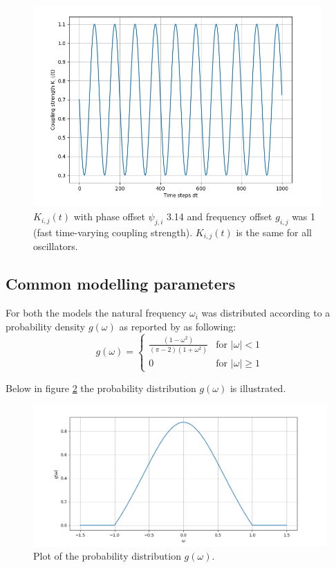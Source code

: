\documentclass{article}
\begin{document}
\begin{figure}[H]
    \centering
    \includegraphics[width = 11cm]{Proj_fig3.png}
    \caption{\( K_{i,j}(t) \) with phase offset \( \psi_{j,i} \) 3.14 and frequency offset \( g_{i,j} \) was 1 (fast time-varying coupling strength). \( K_{i,j}(t) \) is the same for all oscillators.}
    \label{fig:3}
\end{figure}

\subsection{Common modelling parameters}

For both the models the natural frequency \(\omega_i\) was distributed according to a probability density \(g(\omega)\) as reported by \cite{Cumin} as following:
\begin{equation}
g(\omega) = 
\begin{cases} 
\frac{(1 - \omega^2)}{(\pi - 2)(1 + \omega^2)} & \text{for } |\omega| < 1 \\
0 & \text{for } |\omega| \geq 1
\end{cases}
\end{equation}

Below in figure \ref{fig:4} the probability distribution \(g(\omega)\) is illustrated.

\begin{figure}[H]
    \centering
    \includegraphics[width = 12cm]{G_omega.png}
    \caption{Plot of the probability distribution \(g(\omega)\).}
    \label{fig:4}
\end{figure}
\end{document}

